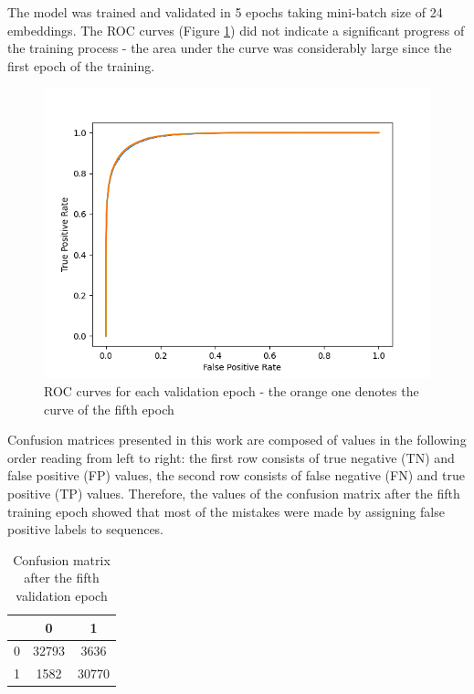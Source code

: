 \documentclass[12pt]{article}
\begin{document}
	The model was trained and validated in 5 epochs taking mini-batch size of 24
	embeddings. The ROC curves (Figure \ref{figure:SLP003validation4}) did not 
	indicate a significant progress of the training process - the area under 
	the curve was considerably large since the
	first epoch of the training.

	\begin{figure}[h!]
		\centering
		\includegraphics[scale=0.7]{validation_4_2713.png}

		\caption{ ROC curves for each validation epoch - the orange 
		one denotes the curve of the fifth epoch}
		\label{figure:SLP003validation4}
	\end{figure}

	Confusion matrices presented in this work are composed of values in the
	following order reading from left to right: the first row consists of true 
	negative (TN) and false positive (FP) values, the second row consists of 
	false negative (FN) and true positive (TP) values.
	Therefore, the values of the confusion matrix after the fifth training epoch
	showed that most of the mistakes were made by assigning false positive 
	labels to sequences.

	\begin{table}[h!]
		\caption{Confusion matrix after the fifth validation epoch}
		\vspace{0.2cm}
		\centering
		\begin{tabular}{ | c | c c | }
			\hline 
			& 0 & 1 \\
			\hline  
			0 & 32793 & 3636 \\
			1 & 1582 & 30770 \\
			\hline    
		\end{tabular}
		\label{table:SLP003confusionMatrixValidation4}
	\end{table}
\end{document}
